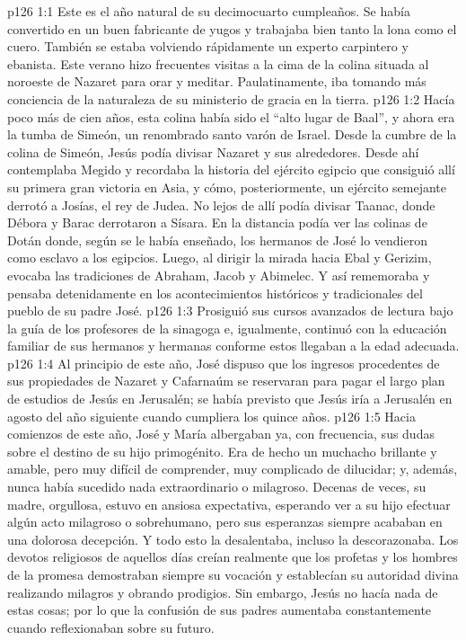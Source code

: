 \vs p126 1:1 Este es el año natural de su decimocuarto cumpleaños. Se había convertido en un buen fabricante de yugos y trabajaba bien tanto la lona como el cuero. También se estaba volviendo rápidamente un experto carpintero y ebanista. Este verano hizo frecuentes visitas a la cima de la colina situada al noroeste de Nazaret para orar y meditar. Paulatinamente, iba tomando más conciencia de la naturaleza de su ministerio de gracia en la tierra.
\vs p126 1:2 Hacía poco más de cien años, esta colina había sido el “alto lugar de Baal”, y ahora era la tumba de Simeón, un renombrado santo varón de Israel. Desde la cumbre de la colina de Simeón, Jesús podía divisar Nazaret y sus alrededores. Desde ahí contemplaba Megido y recordaba la historia del ejército egipcio que consiguió allí su primera gran victoria en Asia, y cómo, posteriormente, un ejército semejante derrotó a Josías, el rey de Judea. No lejos de allí podía divisar Taanac, donde Débora y Barac derrotaron a Sísara. En la distancia podía ver las colinas de Dotán donde, según se le había enseñado, los hermanos de José lo vendieron como esclavo a los egipcios. Luego, al dirigir la mirada hacia Ebal y Gerizim, evocaba las tradiciones de Abraham, Jacob y Abimelec. Y así rememoraba y pensaba detenidamente en los acontecimientos históricos y tradicionales del pueblo de su padre José.
\vs p126 1:3 Prosiguió sus cursos avanzados de lectura bajo la guía de los profesores de la sinagoga e, igualmente, continuó con la educación familiar de sus hermanos y hermanas conforme estos llegaban a la edad adecuada.
\vs p126 1:4 Al principio de este año, José dispuso que los ingresos procedentes de sus propiedades de Nazaret y Cafarnaúm se reservaran para pagar el largo plan de estudios de Jesús en Jerusalén; se había previsto que Jesús iría a Jerusalén en agosto del año siguiente cuando cumpliera los quince años.
\vs p126 1:5 Hacia comienzos de este año, José y María albergaban ya, con frecuencia, sus dudas sobre el destino de su hijo primogénito. Era de hecho un muchacho brillante y amable, pero muy difícil de comprender, muy complicado de dilucidar; y, además, nunca había sucedido nada extraordinario o milagroso. Decenas de veces, su madre, orgullosa, estuvo en ansiosa expectativa, esperando ver a su hijo efectuar algún acto milagroso o sobrehumano, pero sus esperanzas siempre acababan en una dolorosa decepción. Y todo esto la desalentaba, incluso la descorazonaba. Los devotos religiosos de aquellos días creían realmente que los profetas y los hombres de la promesa demostraban siempre su vocación y establecían su autoridad divina realizando milagros y obrando prodigios. Sin embargo, Jesús no hacía nada de estas cosas; por lo que la confusión de sus padres aumentaba constantemente cuando reflexionaban sobre su futuro.
